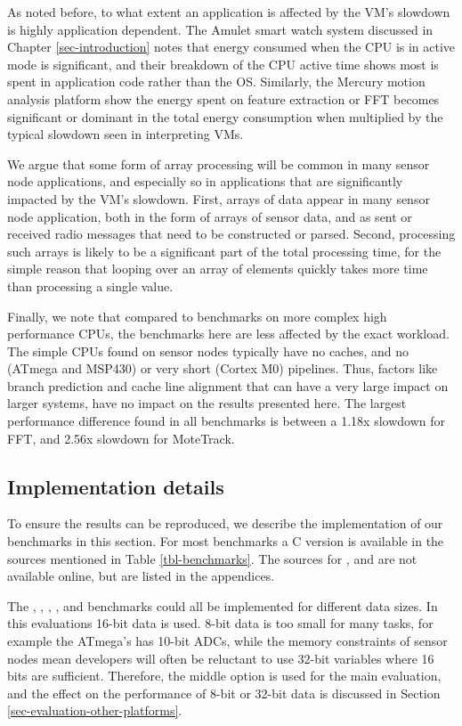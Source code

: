 As noted before, to what extent an application is affected by the VM's slowdown is highly application dependent. The Amulet smart watch system discussed in Chapter \ref{sec-introduction} notes that energy consumed when the CPU is in active mode is significant, and their breakdown of the CPU active time shows most is spent in application code rather than the OS. Similarly, the Mercury motion analysis platform show the energy spent on feature extraction or FFT becomes significant or dominant in the total energy consumption when multiplied by the typical slowdown seen in interpreting VMs.

We argue that some form of array processing will be common in many sensor node applications, and especially so in applications that are significantly impacted by the VM's slowdown. First, arrays of data appear in many sensor node application, both in the form of arrays of sensor data, and as sent or received radio messages that need to be constructed or parsed. Second, processing such arrays is likely to be a significant part of the total processing time, for the simple reason that looping over an array of elements quickly takes more time than processing a single value.

Finally, we note that compared to benchmarks on more complex high performance CPUs, the benchmarks here are less affected by the exact workload. The simple CPUs found on sensor nodes typically have no caches, and no (ATmega and MSP430) or very short (Cortex M0) pipelines. Thus, factors like branch prediction and cache line alignment that can have a very large impact on larger systems, have no impact on the results presented here. The largest performance difference found in all benchmarks is between a 1.18x slowdown for FFT, and 2.56x slowdown for MoteTrack.

\subsection{Implementation details}
To ensure the results can be reproduced, we describe the implementation of our benchmarks in this section. For most benchmarks a C version is available in the sources mentioned in Table \ref{tbl-benchmarks}. The sources for ,  and  are not available online, but are listed in the appendices.

The , , , , and  benchmarks could all be implemented for different data sizes. In this evaluations 16-bit data is used. 8-bit data is too small for many tasks, for example the ATmega's has 10-bit ADCs, while the memory constraints of sensor nodes mean developers will often be reluctant to use 32-bit variables where 16 bits are sufficient. Therefore, the middle option is used for the main evaluation, and the effect on the performance of 8-bit or 32-bit data is discussed in Section \ref{sec-evaluation-other-platforms}.

